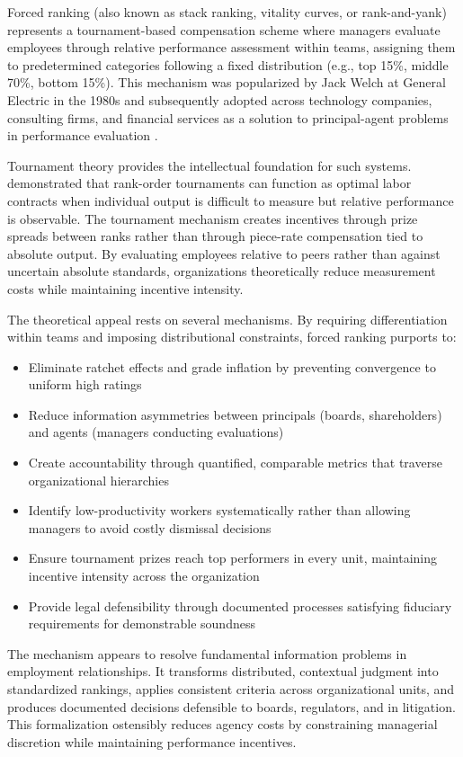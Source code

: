 \documentclass[12pt]{article}
\begin{document}
Forced ranking (also known as stack ranking, vitality curves, or rank-and-yank) represents a tournament-based compensation scheme where managers evaluate employees through relative performance assessment within teams, assigning them to predetermined categories following a fixed distribution (e.g., top 15\%, middle 70\%, bottom 15\%). This mechanism was popularized by Jack Welch at General Electric in the 1980s and subsequently adopted across technology companies, consulting firms, and financial services as a solution to principal-agent problems in performance evaluation \citep{scullen2005forced, stewart2010forced}.

Tournament theory provides the intellectual foundation for such systems. \citet{lazear1981rank} demonstrated that rank-order tournaments can function as optimal labor contracts when individual output is difficult to measure but relative performance is observable. The tournament mechanism creates incentives through prize spreads between ranks rather than through piece-rate compensation tied to absolute output. By evaluating employees relative to peers rather than against uncertain absolute standards, organizations theoretically reduce measurement costs while maintaining incentive intensity.

The theoretical appeal rests on several mechanisms. By requiring differentiation within teams and imposing distributional constraints, forced ranking purports to:

\begin{itemize}
\item Eliminate ratchet effects and grade inflation by preventing convergence to uniform high ratings
\item Reduce information asymmetries between principals (boards, shareholders) and agents (managers conducting evaluations)
\item Create accountability through quantified, comparable metrics that traverse organizational hierarchies
\item Identify low-productivity workers systematically rather than allowing managers to avoid costly dismissal decisions
\item Ensure tournament prizes reach top performers in every unit, maintaining incentive intensity across the organization
\item Provide legal defensibility through documented processes satisfying fiduciary requirements for demonstrable soundness
\end{itemize}

The mechanism appears to resolve fundamental information problems in employment relationships. It transforms distributed, contextual judgment into standardized rankings, applies consistent criteria across organizational units, and produces documented decisions defensible to boards, regulators, and in litigation. This formalization ostensibly reduces agency costs by constraining managerial discretion while maintaining performance incentives.
\end{document}

